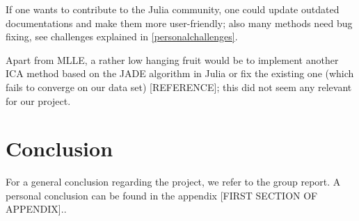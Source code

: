 \documentclass[journal, a4paper]{IEEEtran}
\begin{document}
If one wants to contribute to the Julia community, one could update outdated documentations and make them more user-friendly; also many methods need bug fixing, see challenges explained in \ref{personalchallenges}. 

Apart from MLLE, a rather low hanging fruit would be to implement another ICA method based on the JADE algorithm in Julia or fix the existing one (which fails to converge on our data set) [REFERENCE]; this did not seem any relevant for our project.


\section{Conclusion}
For a general conclusion regarding the project, we refer to the group report. A personal conclusion can be found in the appendix [FIRST SECTION OF APPENDIX]..

\newpage
\appendix 
\end{document}
